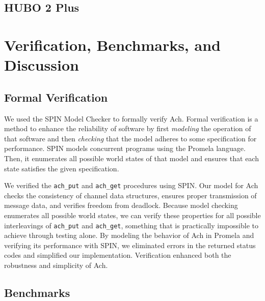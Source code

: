 \documentclass[letterpaper]{IEEEtran}
\begin{document}
\subsection{HUBO 2 Plus}


\section{Verification, Benchmarks, and Discussion}
\label{sect:vb}
\subsection{Formal Verification}

We used the SPIN Model Checker \cite{holtzman2004spin} to formally
verify Ach.  Formal verification is a method to enhance the
reliability of software by first \emph{modeling} the operation of that
software and then \emph{checking} that the model adheres to some
specification for performance. SPIN models concurrent programs using
the Promela language.  Then, it enumerates all possible world states
of that model and ensures that each state satisfies the given
specification.

We verified the {\tt ach\_put} and {\tt ach\_get} procedures
using SPIN.  Our model for Ach checks the consistency of channel data
structures, ensures proper transmission of message data, and verifies
freedom from deadlock.  Because model checking enumerates all possible
world states, we can verify these properties for all possible
interleavings of {\tt ach\_put} and {\tt ach\_get}, something that is
practically impossible to achieve through testing alone.  By modeling
the behavior of Ach in Promela and verifying its performance with
SPIN, we eliminated errors in the returned status codes and simplified
our implementation.  Verification enhanced both the robustness and
simplicity of Ach.


\subsection{Benchmarks}
\end{document}
